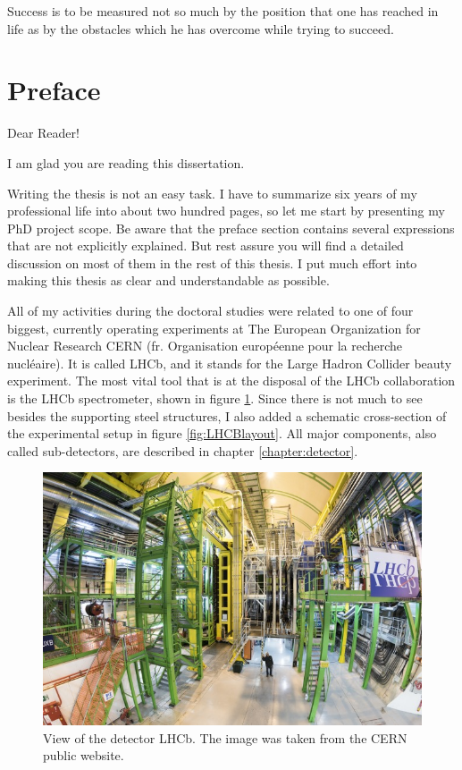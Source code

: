 \begin{savequote}[75mm] 
Success is to be measured not so much by the position that one has reached in life as by the obstacles which he has overcome while trying to succeed.
\end{savequote}



\chapter*{Preface}
\label{introduction}

Dear Reader! 

I am glad you are reading this dissertation.  

Writing the thesis is not an easy task. I have to summarize six years of my professional life into about two hundred pages, so let me start by presenting my PhD project scope.  Be aware that the preface section contains several expressions that are not explicitly explained. But rest assure you will find a detailed discussion on most of them in the rest of this thesis. I put much effort into making this thesis as clear and understandable as possible. 

All of my activities during the doctoral studies were related to one of four biggest, currently operating experiments at The European Organization for Nuclear Research CERN (fr.  Organisation européenne pour la recherche nucléaire).  It is called LHCb, and it stands for the Large Hadron Collider beauty experiment. The most vital tool that is at the disposal of the LHCb collaboration is the LHCb spectrometer, shown in figure \ref{fig:LHCBphoto}. Since there is not much to see besides the supporting steel structures, I also added a schematic cross-section of the experimental setup in figure \ref{fig:LHCBlayout}. All major components, also called sub-detectors, are described in chapter \ref{chapter:detector}. 


\begin{figure}[!hb]
\centering
\includegraphics[width=\textwidth]{figures/LHCB_photo}
\caption{View of the detector LHCb. The image was taken from the CERN public website. 
\label{fig:LHCBphoto}}
\end{figure}

